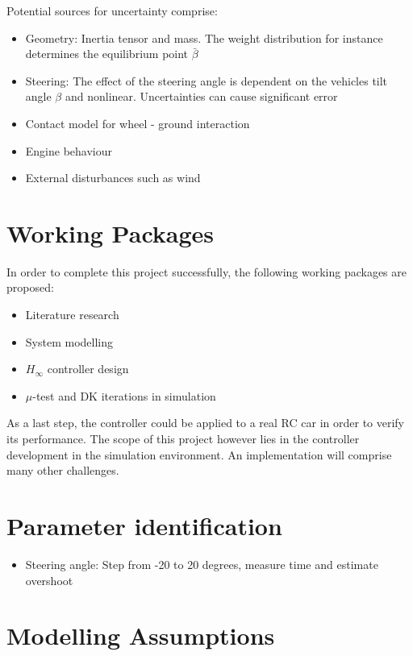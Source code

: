 \documentclass[conference]{IEEEtran}
\begin{document}
Potential sources for uncertainty comprise:

\begin{itemize}
    \item Geometry: Inertia tensor and mass. The weight distribution for instance determines the equilibrium point $\bar{\beta}$
    \item Steering: The effect of the steering angle is dependent on the vehicles tilt angle $\beta$ and nonlinear. Uncertainties can cause significant error
    \item Contact model for wheel - ground interaction
    \item Engine behaviour
    \item External disturbances such as wind
\end{itemize}


\section{Working Packages}

In order to complete this project successfully, the following working packages are proposed:

\begin{itemize}
    \item Literature research
    \item System modelling
    \item $H_\infty$ controller design
    \item $\mu$-test and DK iterations in simulation
\end{itemize}

As a last step, the controller could be applied to a real RC car in order to verify its performance. The scope of this project however lies in the controller development in the simulation environment. An implementation will comprise many other challenges.
 
 
\section{Parameter identification}

\begin{itemize}
    \item Steering angle: Step from -20 to 20 degrees, measure time and estimate overshoot
\end{itemize}
 
 
\section{Modelling Assumptions}
\end{document}
